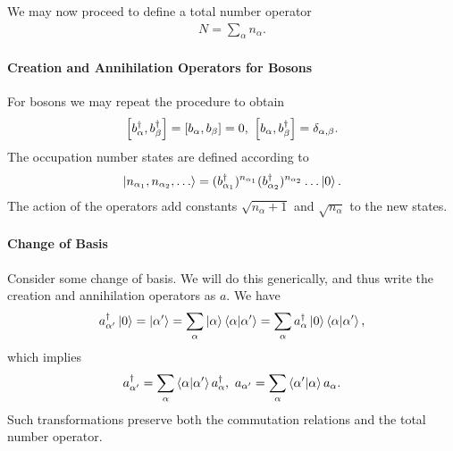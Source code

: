 We may now proceed to define a total number operator
\begin{align*}
	N = \sum\limits_{\alpha}n_{\alpha}.
\end{align*}

\paragraph{Creation and Annihilation Operators for Bosons}
For bosons we may repeat the procedure to obtain
\begin{align*}
	\comm{\adj{b_{\alpha}}}{\adj{b_{\beta}}} = \comm{b_{\alpha}}{b_{\beta}} = 0,\ \comm{b_{\alpha}}{\adj{b_{\beta}}} = \delta_{\alpha, \beta}.
\end{align*}
The occupation number states are defined according to
\begin{align*}
	\ket{n_{\alpha_{1}}, n_{\alpha_{2}}, \dots} = (b_{\alpha_{1}}^{\dagger})^{n_{\alpha_{1}}}(b_{\alpha_{2}}^{\dagger})^{n_{\alpha_{2}}}\dots\ket{0}.
\end{align*}
The action of the operators add constants $\sqrt{n_{\alpha} + 1}$ and $\sqrt{n_{\alpha}}$ to the new states.

\paragraph{Change of Basis}
Consider some change of basis. We will do this generically, and thus write the creation and annihilation operators as $a$. We have
\begin{align*}
	a_{\alpha^{\prime}}^{\dagger}\ket{0} = \ket{\alpha^{\prime}} = \sum\limits_{\alpha}\ket{\alpha}\braket{\alpha}{\alpha^{\prime}} = \sum\limits_{\alpha}a_{\alpha}^{\dagger}\ket{0}\braket{\alpha}{\alpha^{\prime}},
\end{align*}
which implies
\begin{align*}
	\adj{a_{\alpha^{\prime}}} = \sum\limits_{\alpha}\braket{\alpha}{\alpha^{\prime}}\adj{a_{\alpha}},\ a_{\alpha^{\prime}} = \sum\limits_{\alpha}\braket{\alpha^{\prime}}{\alpha}a_{\alpha}.
\end{align*}
Such transformations preserve both the commutation relations and the total number operator.

